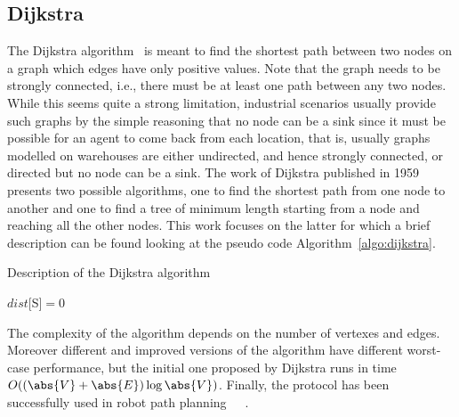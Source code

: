 \subsection{Dijkstra}
The Dijkstra algorithm~\cite{dijkstra} is meant to find the shortest path 
between two nodes on a graph which edges have only positive values. Note that
the graph needs to be strongly connected, i.e., there must be at least one path
between any two nodes. While this seems quite a strong limitation, industrial
scenarios usually provide such graphs by the simple reasoning that no node can
be a sink since it must be possible for an agent to come back from each
location, that is, usually graphs modelled on warehouses are either undirected, 
and hence strongly connected, or directed but no node can be a sink. \newline
The work of Dijkstra published in 1959~\cite{dijkstra} presents two possible
algorithms, one to find the shortest path from one node to another and one to
find a tree of minimum length starting from a node and reaching all the other
nodes. This work focuses on the latter for which a brief description can be 
found looking at the pseudo code Algorithm~\ref{algo:dijkstra}.
\begin{algorithm}
  \DontPrintSemicolon
  \caption{Description of the Dijkstra algorithm}
  \label{algo:dijkstra}

  \;

  \;

  $dist[$S$]=0$\;
  \;
\end{algorithm}\newline
The complexity of the algorithm depends on the number of vertexes and edges.
Moreover different and improved versions of the algorithm have different
worst-case performance, but the initial one proposed by Dijkstra runs in time
$O((\abs{V}+\abs{E})\log\abs{V})$.\newline
Finally, the protocol has been successfully used in robot path
planning~\cite{dijkstra1}~\cite{dijkstra2}~\cite{dijkstra3}.
%
%
